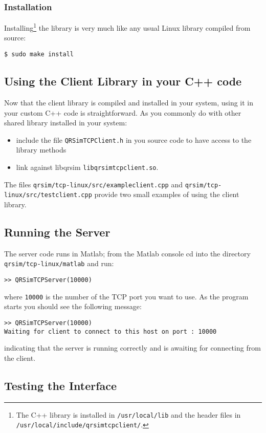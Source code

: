 \documentclass[a4paper,11pt]{report}
\begin{document}
\subsubsection{Installation}\label{inst}
Installing\footnote{The C++ library is installed in \texttt{/usr/local/lib} and the header files in \texttt{/usr/local/include/qrsimtcpclient/}.} the library is very much like any usual Linux library compiled from source:

\begin{verbatim}
$ sudo make install
\end{verbatim}

\subsection{Using the Client Library in your C++ code}

Now that the client library is compiled and installed in your system, using it in your custom C++ code is straightforward.
As you commonly do with other shared library installed in your system:
\begin{itemize}
\item include the file \texttt{QRSimTCPClient.h} in you source code to have access to the library methods
\item link against libqrsim \texttt{libqrsimtcpclient.so}.
\end{itemize}
The files \texttt{qrsim/tcp-linux/src/exampleclient.cpp} and \texttt{qrsim/tcp-linux/src/testclient.cpp} provide two small examples of using the client library.

\subsection{Running the Server}\label{run}
The server code runs in Matlab; from the Matlab console cd into the directory \texttt{qrsim/tcp-linux/matlab} and run:
\begin{verbatim}
>> QRSimTCPServer(10000)
\end{verbatim}
where \texttt{10000} is the number of the TCP port you want to use. As the program starts you should see the following message:
\begin{verbatim}
>> QRSimTCPServer(10000)
Waiting for client to connect to this host on port : 10000
\end{verbatim}
indicating that the server is running correctly and is awaiting for connecting from the client.

\subsection{Testing the Interface}
\end{document}
